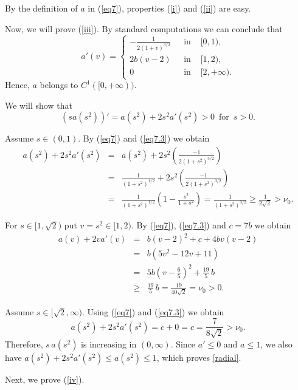 \documentclass[11pt,leqno]{amsart}
\makeatletter
\renewenvironment{proof}[1][\proofname]{%
  \par
  \pushQED{\qed}%
  \normalfont
  \topsep6\p@\@plus6\p@\relax
  \trivlist
  \item[\hskip\labelsep\itshape #1\@addpunct{.}]%
  \hspace{0.5em}\ignorespaces
}{%
  \popQED
  \endtrivlist\@endpefalse
}
\makeatother
\begin{document}
\begin{proof}
By the definition of $a$ in (\ref{eq7}), properties (\ref{i}) and (\ref{ii}) are easy.

Now, we will prove (\ref{iii}). By standard computations we can conclude that
\begin{equation}\label{eq7.3}
	a'(v) = \left\{
	\begin{array}{rcl}
		-\frac{1}{2(1+v)^{3/2}} & \, \, \mbox{ in } & [0,1), \\
		2b(v-2) & \, \, \mbox{ in } & [1,2), \\
		0 & \, \, \mbox{ in } & [2,+\infty).
	\end{array}
	\right.
\end{equation}
Hence, $a$ belongs to $C^1([0,+\infty))$. 

We will show that
\[
(sa(s^2))'=a(s^2)+2s^2a'(s^2)>0 \, \mbox{ for } \, s>0.
\]

Assume $s\in  (0,1)$. By (\ref{eq7}) and (\ref{eq7.3}) we obtain
\[
\begin{array}{rcl}
	a(s^2)+2s^2a'(s^2) &= & a(s^2)+2s^2\left(\frac{-1}{2(1+s^2)^{3/2}}\right) \\
	&= & \frac{1}{(1+s^2)^{1/2}}+2s^2\left(\frac{-1}{2(1+s^2)^{3/2}}\right)\\
	&=& \frac{1}{(1+s^2)^{1/2}}\left(1-\frac{s^2}{1+s^2}\right)=\frac{1}{(1+s^2)^{3/2}}\geq \frac{1}{2\sqrt2}>\nu_0.
\end{array}
\]

For $s\in  [1,\sqrt{2})$ put $v=s^2\in[1,2)$. By (\ref{eq7}), (\ref{eq7.3}) and $c=7b$ we obtain
\begin{equation}\label{middle}
\begin{array}{rcl}
	a(v)+2va'(v) &= & b(v-2)^2+c+4bv(v-2) \\
	&= & b\left(5v^2-12v+11\right)\\
	&=& 5b\left(v-\frac65\right)^2+\frac{19}{5}\,b\\
	&\geq& \frac{19}{5}\,b=\frac{19}{40\sqrt2}=\nu_0>0.
\end{array}
\end{equation}

Assume $s\in  [\sqrt{2},\infty)$. Using (\ref{eq7}) and (\ref{eq7.3}) we obtain
\[
a(s^2)+2s^2a'(s^2) = c+0=c=\frac{7}{8\sqrt2}>\nu_0.
\]
Therefore, $s\,a(s^2)$ is increasing in $(0, \infty)$. Since $a'\le0$ and $a\le1$, we also have $a(s^2)+2s^2a'(s^2)\le a(s^2)\le1$, which proves \eqref{radial}.

Next, we prove (\ref{iv}).


\end{proof}
\end{document}
